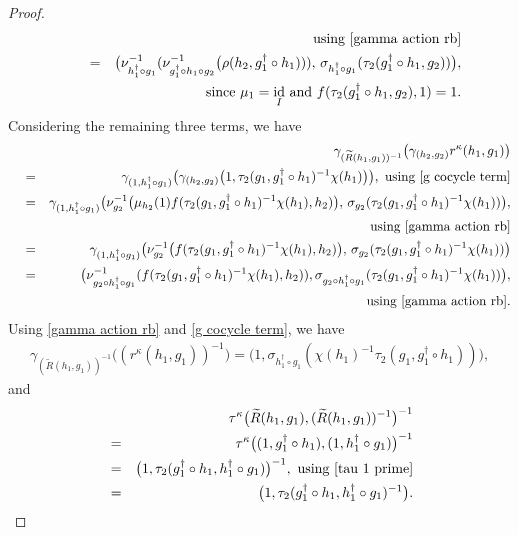 \documentclass{jonasart}
\theoremstyle{plain}
\DeclareMathOperator{\Id}{id}
\begin{document}
\begin{proof}
\begin{eqnarray}
			&&\text{ using \eqref{gamma action rb}}\nonumber\\
			\quad \quad &=&\big(\nu^{-1}_{h_1^\dagger\circ g_1}(\nu^{-1}_{g_1^\dagger\circ h_1\circ g_2}\big(\rho(h_2,g_1^\dagger\circ h_1))),\,\sigma_{h_1^\dagger\circ g_1}(\tau_2(g_1^\dagger\circ h_1,g_2))\big),\label{beta term 3}\\
			&&  ~\textrm{since $\mu_1=\Id_I$ and $f(\tau_2(g_1^\dagger\circ h_1,g_2),1)=1$.}\nonumber
		\end{eqnarray}
		Considering the remaining three terms, we have
		\begin{eqnarray}
			&& \gamma_{(\widetilde{R}(h_1,g_1))^{-1}} \big( \gamma_{(h_2,g_2)}r^\kappa(h_1,g_1)\big)\nonumber\\
			&=&\gamma_{(1,h_1^\dagger\circ g_1)} \big(\gamma_{(h_2,g_2)}\big(1,\tau_2(g_1,g_1^\dagger\circ h_1)^{-1}\chi(h_1)\big)\big),\text{ using \eqref{g cocycle term}}\nonumber\\
			&=& \gamma_{(1,h_1^\dagger\circ g_1)} \big(\nu^{-1}_{g_2} \big(\mu_{h_2}(1)f(\tau_2(g_1,g_1^\dagger \circ h_1)^{-1}\chi(h_1),h_2)\big),\, \sigma_{g_2}(\tau_2(g_1,g_1^\dagger\circ h_1)^{-1}\chi(h_1))\big),\nonumber\\
			&&\text{ using \eqref{gamma action rb}}\nonumber\\
			&=& \gamma_{(1,h_1^\dagger\circ g_1)} \big(\nu^{-1}_{g_2} \big(f(\tau_2(g_1,g_1^\dagger\circ h_1)^{-1}\chi(h_1),h_2)\big), \, \sigma_{g_2}(\tau_2(g_1,g_1^\dagger\circ h_1)^{-1}\chi(h_1))\big)\nonumber\\
			\quad &=&\big(\nu^{-1}_{g_2\circ h_1^{\dagger}\circ g_1}(f(\tau_2(g_1,g_1^\dagger\circ h_1)^{-1}\chi(h_1),h_2)),\sigma_{g_2\circ h_1^{\dagger}\circ g_1}(\tau_2(g_1,g_1^\dagger\circ h_1)^{-1}\chi(h_1))\big)\label{beta term 4},\\
			&&\text{ using \eqref{gamma action rb}.}\nonumber
		\end{eqnarray}
		Using \eqref{gamma action rb} and \eqref{g cocycle term}, we have
		\begin{eqnarray}
			\gamma_{(\widetilde{R}(h_1,g_1))^{-1}} \big((r^\kappa(h_1,g_1))^{-1}\big)
			= \big(1,\sigma_{h_1^{\dagger}\circ g_1}(\chi(h_1)^{-1}\tau_2(g_1,g_1^\dagger\circ h_1)) \big) \label{beta term 5},
		\end{eqnarray}
		and
		\begin{eqnarray}
			&&\tau^\kappa\big(\widetilde{R}(h_1,g_1),(\widetilde{R}(h_1,g_1))^{-1}\big)^{-1}\nonumber\\
			&=&\tau^\kappa\big((1,g_1^\dagger\circ h_1),(1,h_1^\dagger\circ g_1)\big)^{-1}\nonumber\\
			&=&\big(1,\tau_2(g_1^\dagger\circ h_1,h_1^\dagger\circ g_1) \big)^{-1},\text{ using \eqref{tau 1 prime}}\nonumber\\
			&=& \big(1,\tau_2(g_1^\dagger\circ h_1,h_1^\dagger\circ g_1)^{-1} \big).\label{beta term 6}
		\end{eqnarray}
		

\end{proof}
\end{document}

